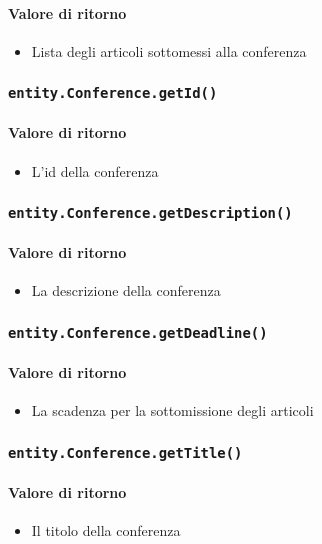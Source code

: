 \paragraph{Valore di ritorno}
\begin{itemize}
\item Lista degli articoli sottomessi alla conferenza
\end{itemize}
\subsubsection{\texttt{entity.Conference.getId()}}
\paragraph{Valore di ritorno}
\begin{itemize}
\item L'id della conferenza
\end{itemize}
\subsubsection{\texttt{entity.Conference.getDescription()}}
\paragraph{Valore di ritorno}
\begin{itemize}
\item La descrizione della conferenza
\end{itemize}
\subsubsection{\texttt{entity.Conference.getDeadline()}}
\paragraph{Valore di ritorno}
\begin{itemize}
\item La scadenza per la sottomissione degli articoli
\end{itemize}
\subsubsection{\texttt{entity.Conference.getTitle()}}
\paragraph{Valore di ritorno}
\begin{itemize}
\item Il titolo della conferenza
\end{itemize}
